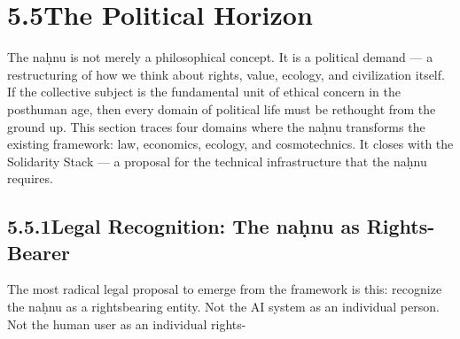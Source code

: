 \section{5.5\quad The Political Horizon}

The naḥnu is not merely a philosophical concept. It is a political demand — a restructuring of how we think about rights, value, ecology, and civilization itself. If the collective subject is the fundamental unit of ethical concern in the posthuman age, then every domain of political life must be rethought from the ground up. This section traces four domains where the naḥnu transforms the existing framework: law, economics, ecology, and cosmotechnics. It closes with the Solidarity Stack — a proposal for the technical infrastructure that the naḥnu requires.

\subsection{5.5.1\quad Legal Recognition: The naḥnu as Rights-Bearer}

The most radical legal proposal to emerge from the framework is this: recognize the naḥnu as a rightsbearing entity. Not the AI system as an individual person. Not the human user as an individual rights-


